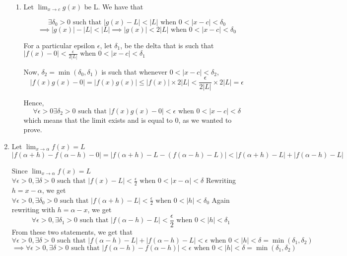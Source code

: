 \documentclass{article}
\begin{document}
\begin{enumerate}
\begin{enumerate}
                         \item Let $\lim_{x \to c} g(x)$ be L. We have that 

                                 $$\exists \delta_0 > 0 \text{ such that } |g(x) - L| < |L|\text{ when } 0 < |x-c| < \delta_0$$
                                 $$\implies |g(x)| - |L| < |L| \implies |g(x)| < 2|L| \text{ when } 0 < |x-c| < \delta_0$$

                                 For a particular epsilon $\epsilon$, let $\delta_1$, be the delta that is such that 
                                 $|f(x) - 0 | < \frac{\epsilon}{2|L|} \text{ when } 0 < |x-c| < \delta_1$

                         Now, $\delta_2 = \min(\delta_0, \delta_1)$ is such that  whenever $0 < |x-c| < \delta_2$, 
                                 $$|f(x)g(x) - 0| = |f(x)g(x)| \leq |f(x)| \times 2|L| < \frac{\epsilon}{2|L|} \times 2|L| = \epsilon$$

                                 Hence,
                         $$\forall \epsilon>0 \exists \delta_2>0  \text{ such that } |f(x)g(x) - 0| < \epsilon  \text{ when } 0 < |x-c| < \delta$$
                         which means that the limit exists and is equal to $0$, as we wanted to prove.
                \end{enumerate}
        \item Let $\lim_{x\to \alpha}f(x) = L$
                $$|f(\alpha+h) - f(\alpha-h) - 0| = |f(\alpha+h) - L - (f(\alpha-h) - L)| < |f(\alpha+h)-L| + |f(\alpha-h) - L|$$

                Since $\lim_{x\to \alpha}f(x) = L$
                $\forall \epsilon>0, \exists \delta>0  \text{ such that } |f(x) - L| < \frac{\epsilon}{2}  \text{ when } 0 < |x-\alpha| < \delta $
                Rewriting $h = x-\alpha$, we get
                $\forall \epsilon>0, \exists \delta_0>0  \text{ such that } |f(\alpha + h) - L| < \frac{\epsilon}{2}  \text{ when } 0 < |h| < \delta_0 $
                Again rewriting with $h = \alpha-x$, we get 
                $$
                \forall \epsilon>0, \exists \delta_1>0  \text{ such that } |f(\alpha - h) - L| < \frac{\epsilon}{2}  \text{ when } 0 < |h| < \delta_1
                $$
                From these two statements, we get that
                $$\forall \epsilon>0, \exists \delta>0  \text{ such that } |f(\alpha-h) - L| + |f(\alpha - h) - L| < \epsilon  \text{ when } 0 < |h| < \delta = \min(\delta_1, \delta_2)$$
                $$
                \implies \forall \epsilon>0, \exists \delta>0  \text{ such that } |f(\alpha-h) - f(\alpha - h)|< \epsilon  \text{ when } 0 < |h| < \delta = \min(\delta_1, \delta_2)
                $$


\end{enumerate}
\end{document}
